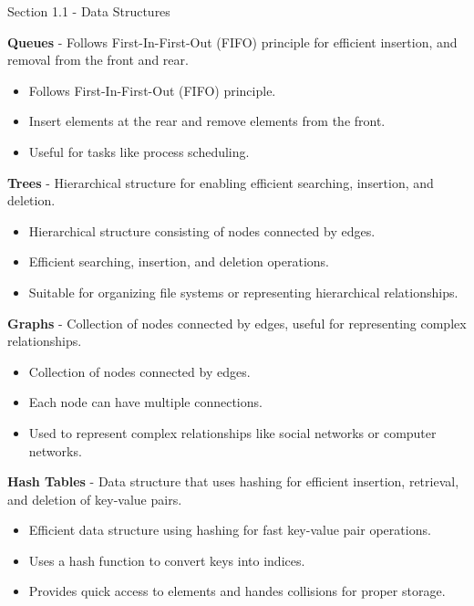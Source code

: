 \begin{notes}{Section 1.1 - Data Structures}
\begin{highlight}
        \textbf{Queues} - Follows First-In-First-Out (FIFO) principle for efficient insertion, and removal from the front
        and rear.
        \begin{itemize}
            \item Follows First-In-First-Out (FIFO) principle.
            \item Insert elements at the rear and remove elements from the front.
            \item Useful for tasks like process scheduling.
        \end{itemize}
    
        \textbf{Trees} - Hierarchical structure for enabling efficient searching, insertion, and deletion.
        \begin{itemize}
            \item Hierarchical structure consisting of nodes connected by edges.
            \item Efficient searching, insertion, and deletion operations.
            \item Suitable for organizing file systems or representing hierarchical relationships.
        \end{itemize}
    
        \textbf{Graphs} - Collection of nodes connected by edges, useful for representing complex relationships.
        \begin{itemize}
            \item Collection of nodes connected by edges.
            \item Each node can have multiple connections.
            \item Used to represent complex relationships like social networks or computer networks.
        \end{itemize}
    
        \textbf{Hash Tables} - Data structure that uses hashing for efficient insertion, retrieval, and deletion of
        key-value pairs.
        \begin{itemize}
            \item Efficient data structure using hashing for fast key-value pair operations.
            \item Uses a hash function to convert keys into indices.
            \item Provides quick access to elements and handes collisions for proper storage.
        \end{itemize}
    

\end{highlight}
\end{notes}
